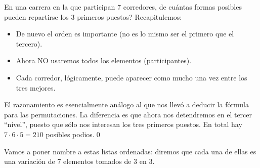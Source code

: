 \begin{Ejemplo} En una carrera en la que participan $7$ corredores,
de cu\'antas formas posibles pueden repartirse los $3$ primeros puestos?
Recapitulemos:
\begin{itemize}
	\item De nuevo el orden es importante (no es lo mismo ser el primero
		que el tercero).
	\item Ahora NO usaremos todos los elementos (participantes).
	\item Cada corredor, l\'ogicamente, puede aparecer como mucho una vez entre los tres mejores.
\end{itemize}
El razonamiento es esencialmente an\'alogo al que nos llev\'o a deducir la
f\'ormula para las permutaciones. La diferencia es que ahora nos detendremos
en el tercer ``nivel'', puesto que s\'olo nos interesan los tres primeros puestos.
En total hay $7\cdot 6 \cdot 5 =210$ posibles podios.\qed
\end{Ejemplo}
Vamos a poner nombre a estas listas ordenadas: diremos que cada una de ellas es una
{ \sf variaci\'on de $7$ elementos tomados de $3$ en $3$}.

